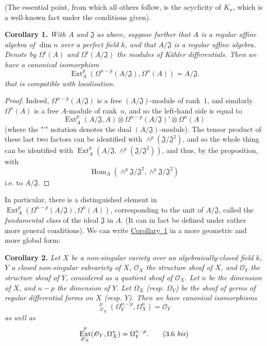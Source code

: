 \documentclass{article}
\newenvironment{itenv}[1]
  {\phantomsection\par\medskip\noindent\textbf{#1.}\itshape}
  {\par\medskip}
\newcommand{\scr}[1]{{\mathscr{#1}}}
\DeclareMathOperator{\Ext}{Ext}
\DeclareMathOperator{\Hom}{Hom}
\DeclareMathOperator{\shExt}{\underline{Ext}}
\newcommand{\oldpage}[1]{\marginpar{\footnotesize$\Big\vert$ \textit{p.~#1}}}
\begin{document}
(The essential point, from which all others follow, is the acyclicity of $K_x$, which is a well-known fact under the conditions given).

\begin{itenv}{Corollary 1}
\label{proposition4corollary1}
  With $A$ and $\mathfrak{J}$ as above, suppose further that $A$ is a regular affine algebra of $\dim n$ over a perfect field $k$, and that $A/\mathfrak{J}$ is a regular affine algebra.
  Denote by $\Omega^i(A)$ and $\Omega^i(A/\mathfrak{J})$ the modules of K\"{a}hler differentials.
  Then we have a canonical isomorphism
  \[
  \label{3.5}
    \Ext_A^p(\Omega^{n-p}(A/\mathfrak{J}),\Omega^n(A)) = A/\mathfrak{J}.
  \tag{3.5}
  \]
  that is compatible with localisation.
\end{itenv}

\begin{proof}
  Indeed, $\Omega^{n-p}(A/\mathfrak{J})$ is a free $(A/\mathfrak{J})$-module of rank~$1$, and similarly $\Omega^n(A)$ is a free $A$-module of rank~$n$, and so the left-hand side is equal to
  \[
    \Ext_A^p(A/\mathfrak{J},A) \otimes \Omega^{n-p}(A/\mathfrak{J})' \otimes \Omega^n(A)
  \]
  (where the "'" notation denotes the dual $(A/\mathfrak{J})$-module).
  The tensor product of these last two factors can be identified with $\wedge^p(\mathfrak{J}/\mathfrak{J}^2)$, and so the whole thing can be identified with $\Ext_A^p(A/\mathfrak{J},\wedge^p(\mathfrak{J}/\mathfrak{J}^2))$, and thus, by the proposition, with
  \[
    \Hom_A(\wedge^p \mathfrak{J}/\mathfrak{J}^2,\wedge^p \mathfrak{J}/\mathfrak{J}^2)
  \]
  i.e. to $A/\mathfrak{J}$.
\end{proof}

In particular, there is a distinguished element in $\Ext_A^p(\Omega^{n-p}(A/\mathfrak{J}),\Omega^n(A))$, corresponding to the unit of $A/\mathfrak{J}$, called the \emph{fundamental class} of the ideal $\mathfrak{J}$ in $A$.
(It can in fact be defined under rather more general conditions).
We can write \hyperref[proposition4corollary1]{Corollary~1} in a more geometric and more global form:

\begin{itenv}{Corollary 2}
\label{proposition4corollary2}
  Let $X$ be a non-singular variety over an algebraically-closed field $k$, $Y$ a closed non-singular subvariety of $X$, $\scr{O}_X$ the structure sheaf of $X$, and $\scr{O}_Y$ the structure sheaf of $Y$, considered as a quotient sheaf of $\scr{O}_X$.
  Let $n$ be the dimension of $X$, and $n-p$ the dimension of $Y$.
\oldpage{149-08}
  Let $\Omega_X$ (resp. $\Omega_Y$) be the sheaf of germs of regular differential forms on $X$ (resp. $Y$).
  Then we have canonical isomorphisms
  \[
  \label{3.6}
    \shExt_{\scr{O}_X}^p(\Omega_Y^{n-p},\Omega_X^n) = \scr{O}_Y
  \tag{3.6}
  \]
  as well as
  \[
  \label{3.6bis}
    \Ext_{\scr{O}_X}^p(\scr{O}_Y,\Omega_X^n) = \Omega_Y^{n-p}.
  \tag{3.6 \emph{bis}}
  \]
\end{itenv}
\end{document}
